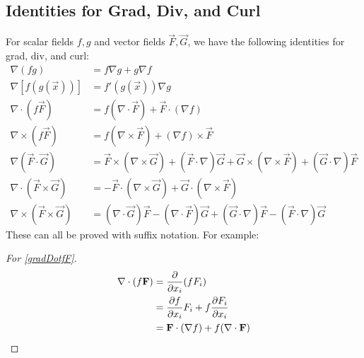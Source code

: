 \documentclass[../main.tex]{subfiles}
\begin{document}
\subsection{Identities for Grad, Div, and Curl}
For scalar fields $f, g$ and vector fields $\vec{F}, \vec{G}$, we have the following identities for grad, div, and curl:
\begin{align*}
  \nabla(fg) &= f \nabla g + g \nabla f  \\
  \nabla[f(g(\vec{x}))] &= f'(g(\vec{x})) \nabla g \tag{$\ast$} \label{gradChain} \\
  \nabla \cdot (f\vec{F}) &= f (\nabla \cdot \vec{F}) + \vec{F} \cdot (\nabla f) \tag{$\dag$} \label{gradDotfF} \\
  \nabla \times (f\vec{F}) &= f (\nabla \times \vec{F}) + (\nabla f) \times \vec{F} \\
  \nabla (\vec{F} \cdot \vec{G}) &= \vec{F} \times (\nabla \times \vec{G}) + (\vec{F} \cdot \nabla)\vec{G} + \vec{G} \times (\nabla \times \vec{F}) + (\vec{G} \cdot \nabla)\vec{F} \tag{$\star$} \label{gradFG} \\
  \nabla \cdot (\vec{F} \times \vec{G}) &= - \vec{F} \cdot (\nabla \times \vec{G}) + \vec{G} \cdot (\nabla \times \vec{F}) \\
  \nabla \times (\vec{F} \times \vec{G}) &= (\nabla \cdot \vec{G})\vec{F} - (\nabla \cdot \vec{F})\vec{G} + (\vec{G} \cdot \nabla)\vec{F} - (\vec{F} \cdot \nabla) \vec{G}
\end{align*}
These can all be proved with suffix notation.
For example:
\begin{proof}[For \cref{gradDotfF}]
  \begin{align*}
    \nabla \cdot (f \vec{F}) &= \pderiv{}{x_i}(fF_i) \\
                             &= \pderiv{f}{x_i} F_i + f \pderiv{F_i}{x_i} \\
                             &= \vec{F} \cdot (\nabla f) + f (\nabla \cdot \vec{F})
  \end{align*}
\end{proof}
\end{document}
